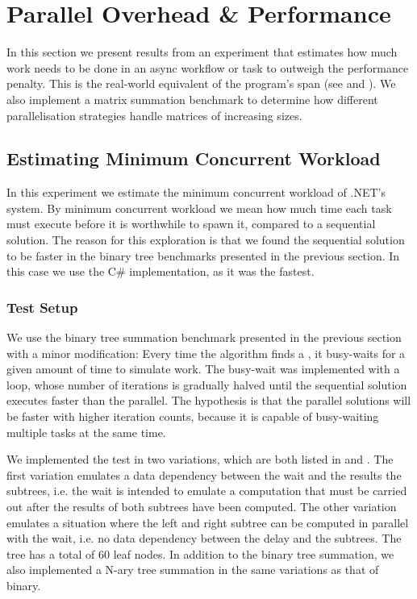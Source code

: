 \section{Parallel Overhead \& Performance}\label{sec:crit:work}
In this section we present results from an experiment that estimates how much work needs to be done in an async workflow or task to outweigh the performance penalty. This is the real-world equivalent of the program's span (see  and ). We also implement a matrix summation benchmark to determine how different parallelisation strategies handle matrices of increasing sizes.

\subsection{Estimating Minimum Concurrent Workload}
In this experiment we estimate the minimum concurrent workload of .NET's  system. By minimum concurrent workload we mean how much time each task must execute before it is worthwhile to spawn it, compared to a sequential solution. The reason for this exploration is that we found the sequential solution to be faster in the binary tree benchmarks presented in the previous section. In this case we use the C\# implementation, as it was the fastest.

\subsubsection{Test Setup}\label{sec:crit-work-setup}
We use the binary tree summation benchmark presented in the previous section with a minor modification: Every time the algorithm finds a , it busy-waits for a given amount of time to simulate work. The busy-wait was implemented with a loop, whose number of iterations is gradually halved until the sequential solution executes faster than the parallel. The hypothesis is that the parallel solutions will be faster with higher iteration counts, because it is capable of busy-waiting multiple tasks at the same time.

We implemented the test in two variations, which are both listed in  and . The first variation emulates a data dependency between the wait and the results the subtrees, i.e. the wait is intended to emulate a computation that must be carried out after the results of both subtrees have been computed. The other variation emulates a situation where the left and right subtree can be computed in parallel with the wait, i.e. no data dependency between the delay and the subtrees. The tree has a total of 60 leaf nodes. In addition to the binary tree summation, we also implemented a N-ary tree summation in the same variations as that of binary.

